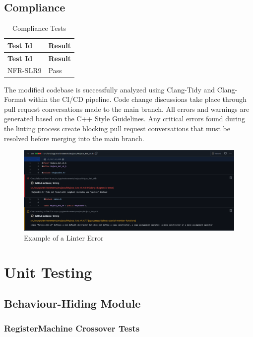 \documentclass[12pt, titlepage]{article}
\begin{document}
\subsection{Compliance}\label{compliance}

\begin{center}
\begin{longtable}{|p{4cm}|p{4cm}|}
\caption{Compliance Tests} \\
\hline
\textbf{Test Id} & \textbf{Result} \\
\hline
\endfirsthead
\hline
\textbf{Test Id} & \textbf{Result} \\
\hline
\endhead
NFR-SLR9 & Pass \\
\hline
\end{longtable}
\end{center}

The modified codebase is successfully analyzed using Clang-Tidy and Clang-Format within the CI/CD pipeline. 
Code change discussions take place through pull request conversations made to the main branch. 
All errors and warnings are generated based on the C++ Style Guidelines. 
Any critical errors found during the linting process create blocking pull request conversations that must be resolved before merging into the main branch.

\begin{figure}[h]
  \centering
  \includegraphics[width=1\textwidth]{img/linter-example.png}
  \caption{Example of a Linter Error}
\end{figure}

\section{Unit Testing}

\subsection{Behaviour-Hiding Module}

\subsubsection{RegisterMachine Crossover Tests}
\end{document}
